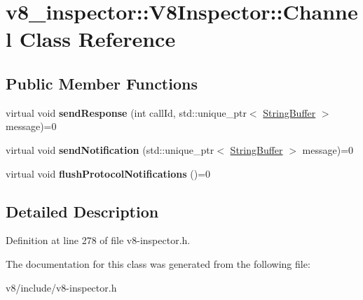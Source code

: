 \hypertarget{classv8__inspector_1_1V8Inspector_1_1Channel}{}\section{v8\+\_\+inspector\+:\+:V8\+Inspector\+:\+:Channel Class Reference}
\label{classv8__inspector_1_1V8Inspector_1_1Channel}
\subsection*{Public Member Functions}
\begin{DoxyCompactItemize}
\item 
\mbox{\label{classv8__inspector_1_1V8Inspector_1_1Channel_ad83740738d43c5ecadca3e3edfe44e65}} 
virtual void {\bfseries send\+Response} (int call\+Id, std\+::unique\+\_\+ptr$<$ \mbox{\hyperlink{classv8__inspector_1_1StringBuffer}{String\+Buffer}} $>$ message)=0
\item 
\mbox{\label{classv8__inspector_1_1V8Inspector_1_1Channel_ab710f81284b5c7a2b75f7b187ddf9ca1}} 
virtual void {\bfseries send\+Notification} (std\+::unique\+\_\+ptr$<$ \mbox{\hyperlink{classv8__inspector_1_1StringBuffer}{String\+Buffer}} $>$ message)=0
\item 
\mbox{\label{classv8__inspector_1_1V8Inspector_1_1Channel_ac30623e11f5b55b76d8a9cc3c007b191}} 
virtual void {\bfseries flush\+Protocol\+Notifications} ()=0
\end{DoxyCompactItemize}


\subsection{Detailed Description}


Definition at line 278 of file v8-\/inspector.\+h.



The documentation for this class was generated from the following file\+:\begin{DoxyCompactItemize}
\item 
v8/include/v8-\/inspector.\+h\end{DoxyCompactItemize}
